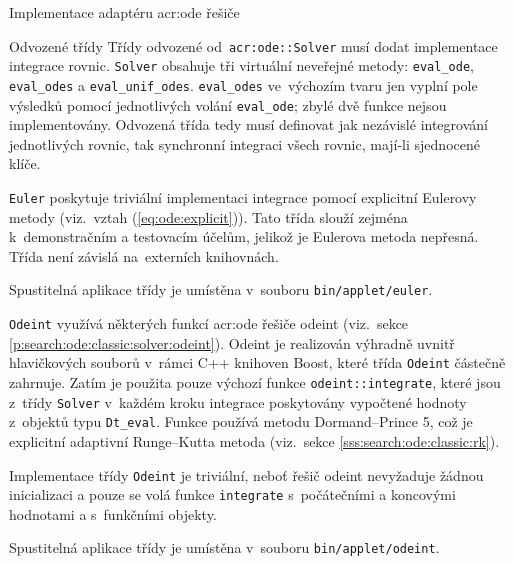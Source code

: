 \documentclass[thesis=M,czech]{FITthesis}[2012/06/26]
\newcommand{\acrlabel}[1]{acr:#1}
\newcommand{\acr}[1]{\acrshort{\acrlabel{#1}}}
\newcommand{\id}[1]{\texttt{#1}}
\newcommand{\rf}[1]{\ref{#1}}
\newcommand{\rfeq}[1]{(\rf{eq:#1})}
\newcommand{\binDir}{\id{bin}}
\newcommand{\appletDir}{\id{\binDir{}/\-applet}}
\newcommand{\appletFn}[1]{\id{\appletDir{}/\-#1}}
\begin{document}
\begin{section}{Implementace adaptéru \acr{ode} řešiče}

\begin{subsection}{Odvozené třídy}
\label{ss:impl:ode:derived}
Třídy odvozené od~\id{\acr{ode}::\-Solver}
musí dodat implementace integrace rovnic.
\id{Solver} obsahuje tři virtuální neveřejné metody:
\id{eval\_\-ode}, \id{eval\_\-odes}
a \id{eval\_\-unif\_\-odes}.
\id{eval\_\-odes} ve~výchozím tvaru
jen vyplní pole výsledků pomocí
jednotlivých volání \id{eval\_\-ode};
zbylé dvě funkce nejsou implementovány.
Odvozená třída tedy musí definovat
jak nezávislé integrování jednotlivých rovnic,
tak synchronní integraci všech rovnic,
mají-li sjednocené klíče.


\begin{paragraph}{\id{Euler}}
\label{p:impl:ode:derived:euler}
poskytuje triviální implementaci integrace
pomocí explicitní Eulerovy metody
(viz.~vztah \rfeq{ode:explicit}).
Tato třída slouží zejména k~demonstračním a testovacím účelům,
jelikož je Eulerova metoda nepřesná.
Třída není závislá na~externích knihovnách.

Spustitelná aplikace třídy je umístěna v~souboru \appletFn{euler}.
\end{paragraph} %


\begin{paragraph}{\id{Odeint}}
\label{p:impl:ode:derived:odeint}
využívá některých funkcí \acr{ode} řešiče odeint
(viz.~sekce \rf{p:search:ode:classic:solver:odeint}).
Odeint je realizován výhradně uvnitř hlavičkových souborů
v~rámci C++ knihoven Boost,
které třída \id{Odeint} částečně zahrnuje.
Zatím je použita pouze výchozí funkce
\id{odeint::\-integrate},
které jsou z~třídy \id{Solver}
v~každém kroku integrace poskytovány vypočtené
hodnoty z~objektů typu \id{Dt\_\-eval}.
Funkce používá metodu Dormand--Prince 5,
což je explicitní adaptivní Runge--Kutta metoda
(viz.~sekce \rf{sss:search:ode:classic:rk}).

Implementace třídy \id{Odeint} je triviální,
neboť řešič odeint nevyžaduje žádnou
inicializaci a pouze se volá funkce \id{integrate}
s~počátečními a koncovými hodnotami
a s~funkčními objekty.

Spustitelná aplikace třídy je umístěna v~souboru \appletFn{odeint}.
\end{paragraph} %


\end{subsection} %


\end{section} %
\end{document}
